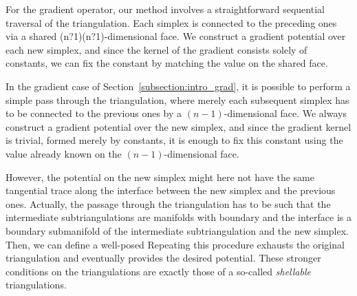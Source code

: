 
For the gradient operator, our method involves a straightforward sequential traversal of the triangulation. 
Each simplex is connected to the preceding ones via a shared (n?1)(n?1)-dimensional face. 
We construct a gradient potential over each new simplex, and since the kernel of the gradient consists solely of constants, 
we can fix the constant by matching the value on the shared face. 

In the gradient case of Section~\ref{subsection:intro_grad}, 
it is possible to perform a simple pass through the triangulation, 
where merely each subsequent simplex has to be connected to the previous ones by a $(n-1)$-dimensional face. 
We always construct a gradient potential over the new simplex, 
and since the gradient kernel is trivial, 
formed merely by constants, it is enough to fix this constant using the value already known on the $(n-1)$-dimensional face.


















However, the potential on the new simplex might here not have the same tangential trace along the interface between the new simplex and the previous ones. 
Actually, the passage through the triangulation has to be such that the intermediate subtriangulations are manifolds with boundary and the interface is a boundary submanifold of the intermediate subtriangulation and the new simplex. 
Then, we can define a well-posed  Repeating this procedure exhausts the original triangulation and eventually provides the desired potential.
These stronger conditions on the triangulations are exactly those of a so-called \emph{shellable} triangulations. 

